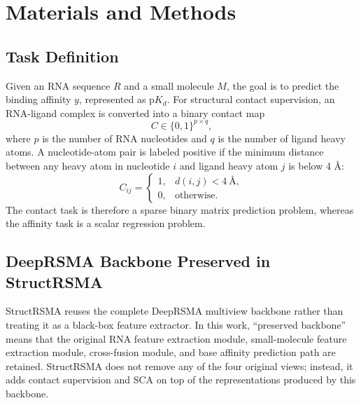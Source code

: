 \documentclass[journal=jcisd8,manuscript=article]{achemso}
\begin{document}
\section{Materials and Methods}

\subsection{Task Definition}

Given an RNA sequence $R$ and a small molecule $M$, the goal is to predict the binding affinity $y$, represented as p$K_d$. For structural contact supervision, an RNA-ligand complex is converted into a binary contact map
\begin{equation}
C \in \{0,1\}^{p \times q},
\end{equation}
where $p$ is the number of RNA nucleotides and $q$ is the number of ligand heavy atoms. A nucleotide-atom pair is labeled positive if the minimum distance between any heavy atom in nucleotide $i$ and ligand heavy atom $j$ is below 4 \AA:
\begin{equation}
C_{ij} =
\begin{cases}
1, & d(i,j) < 4\ \text{\AA},\\
0, & \text{otherwise}.
\end{cases}
\end{equation}
The contact task is therefore a sparse binary matrix prediction problem, whereas the affinity task is a scalar regression problem.

\subsection{DeepRSMA Backbone Preserved in StructRSMA}

StructRSMA reuses the complete DeepRSMA multiview backbone rather than treating it as a black-box feature extractor. In this work, ``preserved backbone'' means that the original RNA feature extraction module, small-molecule feature extraction module, cross-fusion module, and base affinity prediction path are retained.\cite{Huang2024DeepRSMA} StructRSMA does not remove any of the four original views; instead, it adds contact supervision and SCA on top of the representations produced by this backbone.
\end{document}
